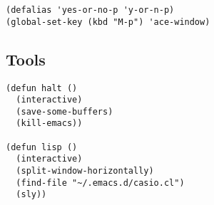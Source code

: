 \documentclass[11pt]{article}
\begin{document}
\begin{verbatim}
(defalias 'yes-or-no-p 'y-or-n-p)
(global-set-key (kbd "M-p") 'ace-window)
\end{verbatim}


\subsection{Tools}
\label{sec-1-8}

\begin{verbatim}
(defun halt ()
  (interactive)
  (save-some-buffers)
  (kill-emacs))

(defun lisp ()
  (interactive)
  (split-window-horizontally)
  (find-file "~/.emacs.d/casio.cl")
  (sly))
\end{verbatim}
\end{document}
